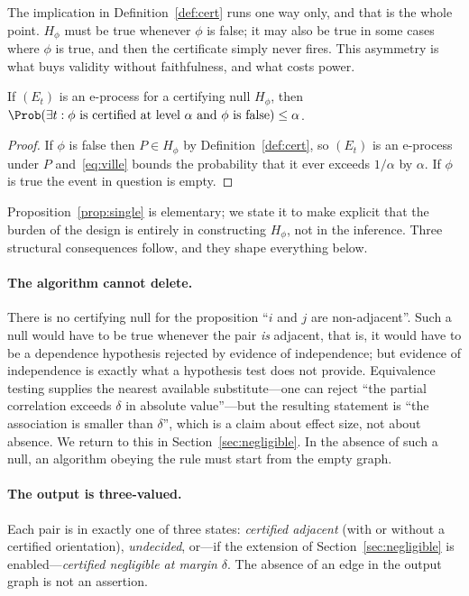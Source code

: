 The implication in Definition~\ref{def:cert} runs one way only, and that is
the whole point. $H_\phi$ must be true whenever $\phi$ is false; it may also
be true in some cases where $\phi$ is true, and then the certificate simply
never fires. This asymmetry is what buys validity without faithfulness, and
what costs power.

\begin{proposition}\label{prop:single}
If $(E_t)$ is an e-process for a certifying null $H_\phi$, then
$\Prob(\exists t: \text{$\phi$ is certified at level $\alpha$ and $\phi$ is
false}) \le \alpha$.
\end{proposition}

\begin{proof}
If $\phi$ is false then $P \in H_\phi$ by Definition~\ref{def:cert}, so
$(E_t)$ is an e-process under $P$ and~\eqref{eq:ville} bounds the probability
that it ever exceeds $1/\alpha$ by $\alpha$. If $\phi$ is true the event in
question is empty.
\end{proof}

Proposition~\ref{prop:single} is elementary; we state it to make explicit that
the burden of the design is entirely in constructing $H_\phi$, not in the
inference. Three structural consequences follow, and they shape everything
below.

\paragraph{The algorithm cannot delete.} There is no certifying null for the
proposition ``$i$ and $j$ are non-adjacent''. Such a null would have to be
true whenever the pair \emph{is} adjacent, that is, it would have to be a
dependence hypothesis rejected by evidence of independence; but evidence of
independence is exactly what a hypothesis test does not provide. Equivalence
testing supplies the nearest available substitute---one can reject ``the
partial correlation exceeds $\delta$ in absolute value''---but the resulting
statement is ``the association is smaller than $\delta$'', which is a claim
about effect size, not about absence. We return to this in
Section~\ref{sec:negligible}. In the absence of such a null, an algorithm
obeying the rule must start from the empty graph.

\paragraph{The output is three-valued.} Each pair is in exactly one of three
states: \emph{certified adjacent} (with or without a certified orientation),
\emph{undecided}, or---if the extension of Section~\ref{sec:negligible} is
enabled---\emph{certified negligible at margin $\delta$}. The absence of an
edge in the output graph is not an assertion.

